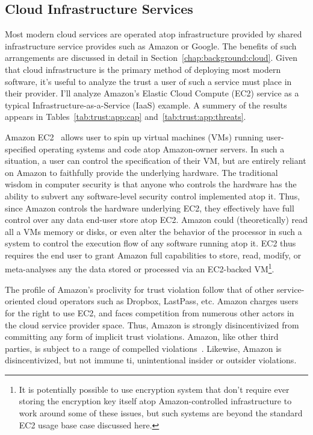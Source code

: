 \subsection{Cloud Infrastructure Services}

Most modern cloud services are operated atop infrastructure provided
by shared infrastructure service provides such as Amazon or
Google. The benefits of such arrangements are discussed in detail in
Section~\ref{chap:background:cloud}. Given that cloud infrastructure
is the primary method of deploying most modern software, it's useful
to analyze the trust a user of such a service must place in their
provider. I'll analyze Amazon's Elastic Cloud Compute (EC2) service as
a typical Infrastructure-as-a-Service (IaaS) example. A summery of the
results appears in Tables~\ref{tab:trust:app:cap}
and~\ref{tab:trust:app:threats}.

Amazon EC2~\cite{amazon-ec2} allows user to spin up virtual machines
(VMs) running user-specified operating systems and code atop
Amazon-owner servers. In such a situation, a user can control the
specification of their VM, but are entirely reliant on Amazon to
faithfully provide the underlying hardware. The traditional wisdom in
computer security is that anyone who controls the hardware has the
ability to subvert any software-level security control implemented
atop it. Thus, since Amazon controls the hardware underlying EC2, they
effectively have full control over any data end-user store atop
EC2. Amazon could (theoretically) read all a VMs memory or disks, or
even alter the behavior of the processor in such a system to control
the execution flow of any software running atop it. EC2 thus requires
the end user to grant Amazon full capabilities to store, read, modify,
or meta-analyses any the data stored or processed via an EC2-backed
VM\footnote{It is potentially possible to use encryption system that
  don't require ever storing the encryption key itself atop
  Amazon-controlled infrastructure to work around some of these
  issues, but such systems are beyond the standard EC2 usage base case
  discussed here.}.

The profile of Amazon's proclivity for trust violation follow that of
other service-oriented cloud operators such as Dropbox, LastPass,
etc. Amazon charges users for the right to use EC2, and faces
competition from numerous other actors in the cloud service provider
space. Thus, Amazon is strongly disincentivized from committing any
form of implicit trust violations. Amazon, like other third parties,
is subject to a range of compelled
violations~\cite{amazon-transparency}. Likewise, Amazon is
disincentivized, but not immune ti, unintentional insider or outsider
violations.

